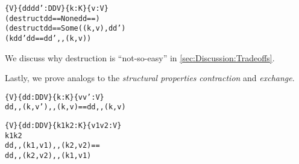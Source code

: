\begin{theorem}
\label{thm:EzDstr}
\justIndent
\begin{alltt}
  \altFAll\{V\} \{dd dd' : DD V\} \{k : K\} \{v : V\} \altRArr
    (destruct dd == None \altRArr dd == \altEmpty)
      \altAnd
    (destruct dd == Some ((k , v) , dd') \altRArr
      (k \altNIn dd' \altAnd dd == dd' ,, (k , v))
\end{alltt}
\end{theorem}



\noindent
%
We discuss why destruction is ``not-so-easy'' in \autoref{sec:Discussion:Tradeoffs}.

Lastly, we prove analogs to the \emph{structural properties} \emph{contraction} and \emph{exchange}.



\begin{theorem}
\label{thm:cont-dicts}
\justIndent
\begin{alltt}
  \altFAll\{V\} \{dd : DD V\} \{k : K\} \{v v' : V\} \altRArr
    dd ,, (k , v') ,, (k , v) == dd ,, (k , v)
\end{alltt}
\end{theorem}

\begin{theorem}
\label{thm:exch-dicts}
\justIndent
\begin{alltt}
  \altFAll\{V\} \{dd : DD V\} \{k1 k2 : K\} \{v1 v2 : V\} \altRArr
    k1 \altNE k2 \altRArr
    dd ,, (k1 , v1) ,, (k2 , v2) ==
    dd ,, (k2 , v2) ,, (k1 , v1)
\end{alltt}
\end{theorem}
